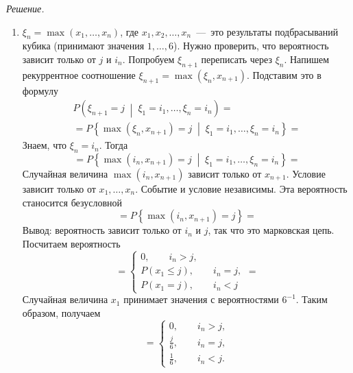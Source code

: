 \textit{Решение.}
\begin{enumerate}[label=\alph*)]
  \item $ \xi_n = \max \left( x_1, \dotsc, x_n \right) $,
  где $x_1, x_2, \dotsc, x_n$~---~это результаты подбрасываний кубика
  (принимают значения $1, \dotsc, 6$).
  Нужно проверить, что вероятность зависит только от $j$ и $i_n$.
  Попробуем $ \xi_{n + 1}$ переписать через $ \xi_n$.
  Напишем рекуррентное соотношение $ \xi_{n + 1} = \max \left( \xi_n, x_{n + 1} \right) $.
  Подставим это в формулу
  \begin{gather*}
    P \left( \xi_{n + 1} = j \; \middle| \; \xi_1 = i_1, \dotsc, \xi_n = i_n \right) = \\
    = P \left\{
      \max \left( \xi_n, x_{n + 1} \right) = j \; \middle| \; \xi_1 = i_1, \dotsc, \xi_n = i_n
    \right\} =
  \end{gather*}
  Знаем, что $ \xi_n = i_n$.
  Тогда
  \begin{equation*}
    = P \left\{
      \max \left( i_n, x_{n + 1} \right) = j \; \middle| \; \xi_1 = i_1, \dotsc, \xi_n = i_n
    \right\} =
  \end{equation*}
  Случайная величина $ \max \left( i_n, x_{n + 1} \right) $ зависит только от $x_{n + 1}$.
  Условие зависит только от $x_1, \dotsc, x_n$.
  Событие и условие независимы.
  Эта вероятность станосится безусловной
  \begin{equation*}
    = P \left\{ \max \left( i_n, x_{n + 1} \right) = j \right\} =
  \end{equation*}
  Вывод: вероятность зависит только от $i_n$ и $j$, так что это марковская цепь.
  Посчитаем вероятность
  \begin{equation*}
    = \begin{cases}
      0, \qquad i_n > j, \\
      P \left( x_1 \leq j \right), \qquad i_n = j, \\
      P \left( x_1 = j \right), \qquad i_n < j
  \end{cases} =
  \end{equation*}
  Случайная величина $x_1$ принимает значения с вероятностями $6^{-1}$.
  Таким образом, получаем
  \begin{equation*}
    = \begin{cases}
        0, \qquad i_n > j, \\
        \frac{j}{6}, \qquad i_n = j, \\
        \frac{1}{6}, \qquad i_n < j.
      \end{cases}
  \end{equation*}


\end{enumerate}
